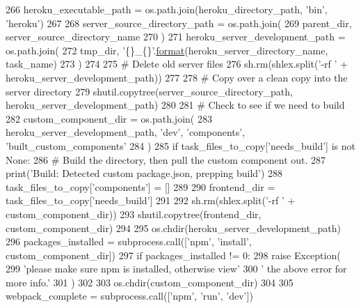 \begin{DoxyCode}
266     heroku\_executable\_path = os.path.join(heroku\_directory\_path, \textcolor{stringliteral}{'bin'}, \textcolor{stringliteral}{'heroku'})
267 
268     server\_source\_directory\_path = os.path.join(
269         parent\_dir, server\_source\_directory\_name
270     )
271     heroku\_server\_development\_path = os.path.join(
272         tmp\_dir, \textcolor{stringliteral}{'\{\}\_\{\}'}.\hyperlink{namespaceparlai_1_1chat__service_1_1services_1_1messenger_1_1shared__utils_a32e2e2022b824fbaf80c747160b52a76}{format}(heroku\_server\_directory\_name, task\_name)
273     )
274 
275     \textcolor{comment}{# Delete old server files}
276     sh.rm(shlex.split(\textcolor{stringliteral}{'-rf '} + heroku\_server\_development\_path))
277 
278     \textcolor{comment}{# Copy over a clean copy into the server directory}
279     shutil.copytree(server\_source\_directory\_path, heroku\_server\_development\_path)
280 
281     \textcolor{comment}{# Check to see if we need to build}
282     custom\_component\_dir = os.path.join(
283         heroku\_server\_development\_path, \textcolor{stringliteral}{'dev'}, \textcolor{stringliteral}{'components'}, \textcolor{stringliteral}{'built\_custom\_components'}
284     )
285     \textcolor{keywordflow}{if} task\_files\_to\_copy[\textcolor{stringliteral}{'needs\_build'}] \textcolor{keywordflow}{is} \textcolor{keywordflow}{not} \textcolor{keywordtype}{None}:
286         \textcolor{comment}{# Build the directory, then pull the custom component out.}
287         print(\textcolor{stringliteral}{'Build: Detected custom package.json, prepping build'})
288         task\_files\_to\_copy[\textcolor{stringliteral}{'components'}] = []
289 
290         frontend\_dir = task\_files\_to\_copy[\textcolor{stringliteral}{'needs\_build'}]
291 
292         sh.rm(shlex.split(\textcolor{stringliteral}{'-rf '} + custom\_component\_dir))
293         shutil.copytree(frontend\_dir, custom\_component\_dir)
294 
295         os.chdir(heroku\_server\_development\_path)
296         packages\_installed = subprocess.call([\textcolor{stringliteral}{'npm'}, \textcolor{stringliteral}{'install'}, custom\_component\_dir])
297         \textcolor{keywordflow}{if} packages\_installed != 0:
298             \textcolor{keywordflow}{raise} Exception(
299                 \textcolor{stringliteral}{'please make sure npm is installed, otherwise view'}
300                 \textcolor{stringliteral}{' the above error for more info.'}
301             )
302 
303         os.chdir(custom\_component\_dir)
304 
305         webpack\_complete = subprocess.call([\textcolor{stringliteral}{'npm'}, \textcolor{stringliteral}{'run'}, \textcolor{stringliteral}{'dev'}])

\end{DoxyCode}
